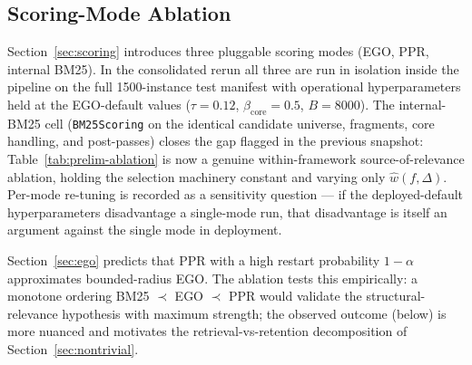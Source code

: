 \documentclass[11pt, a4paper]{article}
\begin{document}
\subsection{Scoring-Mode Ablation}
\label{sec:prelim-ablation}

Section~\ref{sec:scoring} introduces three pluggable scoring modes (EGO, PPR, internal BM25). In the consolidated rerun all three are run in isolation inside the pipeline on the full 1500-instance test manifest with operational hyperparameters held at the EGO-default values ($\tau{=}0.12$, $\beta_{\mathrm{core}}{=}0.5$, $B{=}8000$). The internal-BM25 cell (\texttt{BM25Scoring} on the identical candidate universe, fragments, core handling, and post-passes) closes the gap flagged in the previous snapshot: Table~\ref{tab:prelim-ablation} is now a genuine within-framework source-of-relevance ablation, holding the selection machinery constant and varying only $\hat{w}(f, \Delta)$. Per-mode re-tuning is recorded as a sensitivity question --- if the deployed-default hyperparameters disadvantage a single-mode run, that disadvantage is itself an argument against the single mode in deployment.

Section~\ref{sec:ego} predicts that PPR with a high restart probability $1-\alpha$ approximates bounded-radius EGO. The ablation tests this empirically: a monotone ordering BM25 $\prec$ EGO $\prec$ PPR would validate the structural-relevance hypothesis with maximum strength; the observed outcome (below) is more nuanced and motivates the retrieval-vs-retention decomposition of Section~\ref{sec:nontrivial}.
\end{document}
